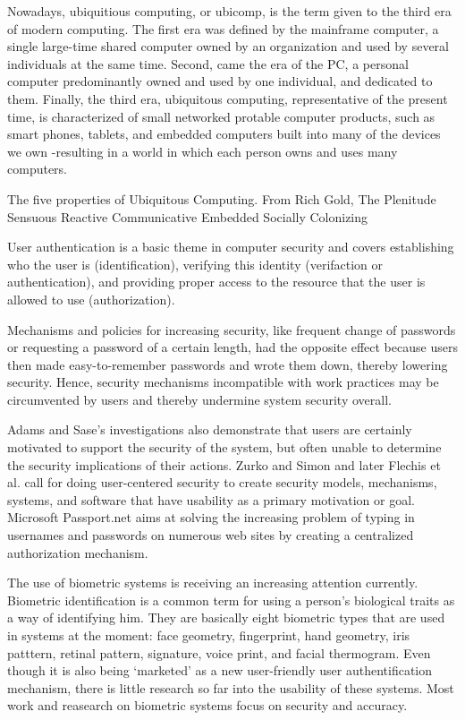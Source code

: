 \documentclass{article}
\begin{document}
Nowadays, ubiquitious computing, or ubicomp, is the term given to the third era of modern computing. The first era was defined by the mainframe computer, a single large-time shared computer owned by an organization and used by several individuals at the same time. Second, came the era of the PC, a personal computer predominantly owned and used by one individual, and dedicated to them. Finally, the third era, ubiquitous computing, representative of the present time, is characterized of small networked protable computer products, such as smart phones, tablets, and embedded computers built into many of the devices we own -resulting in a world in which each person owns and uses many computers.

The five properties of Ubiquitous Computing. From Rich Gold, The Plenitude
Sensuous
Reactive
Communicative 
Embedded Socially 
Colonizing 

User authentication is a basic theme in computer security and covers establishing who the user is (identification), verifying this identity (verifaction or authentication), and providing proper access to the resource that the user is allowed to use (authorization). 

Mechanisms and policies for increasing security, like frequent change of passwords or requesting a password of a certain length, had the opposite effect because users then made easy-to-remember passwords and wrote them down, thereby lowering security. Hence, security mechanisms incompatible with work practices may be circumvented by users and thereby undermine system security overall. 

Adams and Sase’s investigations also demonstrate that users are certainly motivated to support the security of the system, but often unable to determine the security implications of their actions. Zurko and Simon and later Flechis et al. call for doing user-centered security to create security models, mechanisms, systems, and software that have usability as a primary motivation or goal. 
Microsoft Passport.net aims at solving the increasing problem of typing in usernames and passwords on numerous web sites by creating a centralized authorization mechanism.

The use of biometric systems is receiving an increasing attention currently. Biometric identification is a common term for using a person’s biological traits as a way of identifying him. They are basically eight biometric types that are used in systems at the moment: face geometry, fingerprint, hand geometry, iris patttern, retinal pattern, signature, voice print, and facial thermogram. Even though it is also being ‘marketed’ as a new user-friendly user authentification mechanism, there is little research so far into the usability of these systems. Most work and reasearch on biometric systems focus on security and accuracy. 
\end{document}
